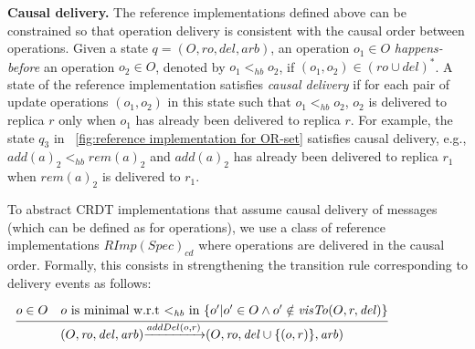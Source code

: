 \noindent
{\bf Causal delivery.} The reference implementations defined above can be constrained so that operation delivery is consistent with the causal order between operations.
Given a state $q = (O,\mathit{ro},\mathit{del},\mathit{arb})$, an operation $o_1\in O$ \emph{happens-before} an operation $o_2\in O$, denoted by $o_1 <_{\mathit{hb}} o_2$, if $(o_1,o_2) \in (\mathit{ro}\cup \mathit{del})^*$. A state of the reference implementation satisfies \emph{causal delivery} if for each pair of update operations $(o_1,o_2)$ in this state such that $o_1 <_{\mathit{hb}} o_2$, $o_2$ is delivered to replica $r$ only when $o_1$ has already been delivered to replica $r$. For example, the state $q_3$ in \figurename~\ref{fig:reference implementation for OR-set} satisfies causal delivery, e.g., $add(a)_2 <_{\mathit{hb}} rem(a)_2$ and $add(a)_2$ has already been delivered to replica $r_1$ when $rem(a)_2$ is delivered to $r_1$.

To abstract CRDT implementations that assume causal delivery of messages (which can be defined as for operations), we use a class of reference implementations $\mathit{RImp}(\mathit{Spec})_{\mathit{cd}}$ where operations are delivered in the causal order. Formally, this consists in strengthening the transition rule corresponding to delivery events as follows:


\medskip
$\begin{array}{l c} \bigfrac{o \in O\quad o\mbox{ is minimal w.r.t $<_{\mathit{hb}}$ in }\{ o' \vert o' \in O \wedge o' \notin \mathit{visTo}(O,r,\mathit{del}) \}} {(O,\mathit{ro},\mathit{del},\mathit{arb}) {\xrightarrow{addDel(o,r)}} (O,\mathit{ro},\mathit{del} \cup \{ (o,r) \},\mathit{arb})} \end{array}$






